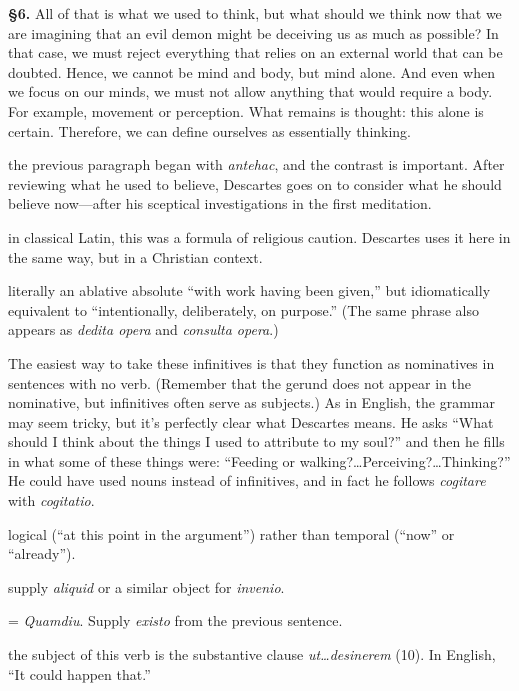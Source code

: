 \prenotes

\textbf{§6.} All of that is what we used to think, but what should we think now that we are imagining that an evil demon might be deceiving us as much as possible? In that case, we must reject everything that relies on an external world that can be doubted. Hence, we cannot be mind and body, but mind alone. And even when we focus on our minds, we must not allow anything that would require a body. For example, movement or perception. What remains is thought: this alone is certain. Therefore, we can define ourselves as essentially thinking.

 the previous paragraph began with \textit{antehac}, and the contrast is important. After reviewing what he used to believe, Descartes goes on to consider what he should believe now---after his sceptical investigations in the first meditation.

 in classical Latin, this was a formula of religious caution. Descartes uses it here in the same way, but in a Christian context.

 literally an ablative absolute ``with work having been given,'' but idiomatically equivalent to ``intentionally, deliberately, on purpose.'' (The same phrase also appears as \textit{dedita opera} and \textit{consulta opera}.)

 The easiest way to take these infinitives is that they function as nominatives in sentences with no verb. (Remember that the gerund does not appear in the nominative, but infinitives often serve as subjects.) As in English, the grammar may seem tricky, but it's perfectly clear what Descartes means. He asks ``What should I think about the things I used to attribute to my soul?'' and then he fills in what some of these things were: ``Feeding or walking?\dots Perceiving?\dots Thinking?'' He could have used nouns instead of infinitives, and in fact he follows \textit{cogitare} with \textit{cogitatio}.

 logical (``at this point in the argument'') rather than temporal (``now'' or ``already'').

 supply \textit{aliquid} or a similar object for \textit{invenio}.

 = \textit{Quamdiu}. Supply \textit{existo} from the previous sentence.

 the subject of this verb is the substantive clause \textit{ut\dots desinerem} (10). In English, ``It could happen that.''

